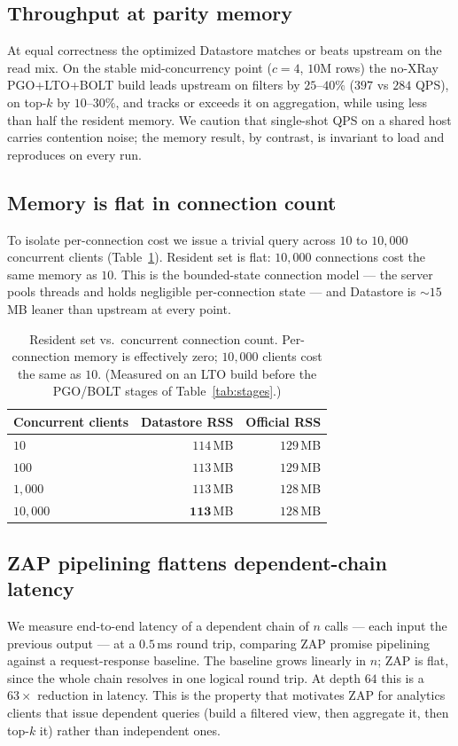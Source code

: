\subsection{Throughput at parity memory}

At equal correctness the optimized Datastore matches or beats upstream on the
read mix. On the stable mid-concurrency point ($c{=}4$, $10$M rows) the
no-XRay PGO+LTO+BOLT build leads upstream on filters by $25$--$40\%$
($397$ vs $284$ QPS), on top-$k$ by $10$--$30\%$, and tracks or exceeds it on
aggregation, while using less than half the resident memory. We caution that
single-shot QPS on a shared host carries contention noise; the memory result,
by contrast, is invariant to load and reproduces on every run.

\subsection{Memory is flat in connection count}

To isolate per-connection cost we issue a trivial query across $10$ to
$10{,}000$ concurrent clients (Table~\ref{tab:scale}). Resident set is flat:
$10{,}000$ connections cost the same memory as $10$. This is the bounded-state
connection model --- the server pools threads and holds negligible per-connection
state --- and Datastore is $\sim\!15$\,MB leaner than upstream at every point.

\begin{table}[H]
\centering
\small
\begin{tabular}{@{}lrr@{}}
\toprule
Concurrent clients & Datastore RSS & Official RSS \\
\midrule
$10$      & $114$\,MB & $129$\,MB \\
$100$     & $113$\,MB & $129$\,MB \\
$1{,}000$ & $113$\,MB & $128$\,MB \\
$10{,}000$& $\mathbf{113}$\,MB & $128$\,MB \\
\bottomrule
\end{tabular}
\caption{Resident set vs.\ concurrent connection count. Per-connection memory is
effectively zero; $10{,}000$ clients cost the same as $10$. (Measured on an
LTO build before the PGO/BOLT stages of Table~\ref{tab:stages}.)}
\label{tab:scale}
\end{table}

\subsection{ZAP pipelining flattens dependent-chain latency}

We measure end-to-end latency of a dependent chain of $n$ calls --- each input
the previous output --- at a $0.5$\,ms round trip, comparing ZAP promise
pipelining against a request-response baseline. The baseline grows linearly in
$n$; ZAP is flat, since the whole chain resolves in one logical round trip. At
depth $64$ this is a $63\times$ reduction in latency. This is the property that
motivates ZAP for analytics clients that issue dependent queries (build a
filtered view, then aggregate it, then top-$k$ it) rather than independent ones.
